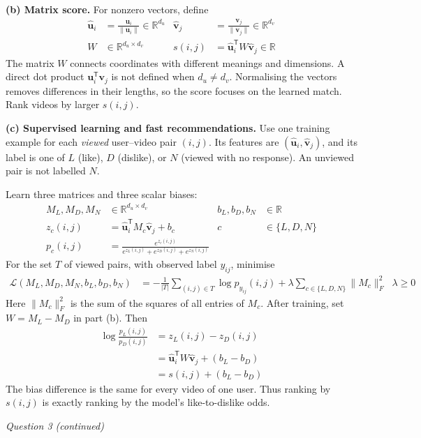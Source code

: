 \documentclass[11pt,a4paper]{article}
\newcommand{\R}{\mathbb{R}}
\newcommand{\norm}[1]{\lVert #1\rVert}
\begin{document}
\textbf{(b) Matrix score.} For nonzero vectors, define
\begin{align*}
\widehat{\mathbf u}_i&=\frac{\mathbf u_i}{\norm{\mathbf u_i}}\in\R^{d_u}&
\widehat{\mathbf v}_j&=\frac{\mathbf v_j}{\norm{\mathbf v_j}}\in\R^{d_v}\\
W&\in\R^{d_u\times d_v}&
s(i,j)&=\widehat{\mathbf u}_i^{\mathsf T}W\widehat{\mathbf v}_j
\in\R
\end{align*}
The matrix $W$ connects coordinates with different meanings and dimensions. A direct dot product $\mathbf u_i^{\mathsf T}\mathbf v_j$ is not defined when $d_u\ne d_v$. Normalising the vectors removes differences in their lengths, so the score focuses on the learned match. Rank videos by larger $s(i,j)$.

\textbf{(c) Supervised learning and fast recommendations.} Use one training example for each \emph{viewed} user--video pair $(i,j)$. Its features are $(\widehat{\mathbf u}_i,\widehat{\mathbf v}_j)$, and its label is one of $L$ (like), $D$ (dislike), or $N$ (viewed with no response). An unviewed pair is not labelled $N$.

Learn three matrices and three scalar biases:
\begin{align*}
M_L,M_D,M_N&\in\R^{d_u\times d_v}&
b_L,b_D,b_N&\in\R\\
z_c(i,j)&=\widehat{\mathbf u}_i^{\mathsf T}M_c\widehat{\mathbf v}_j+b_c
&c&\in\{L,D,N\}\\
p_c(i,j)&=\frac{e^{z_c(i,j)}}{e^{z_L(i,j)}+e^{z_D(i,j)}+e^{z_N(i,j)}}
\end{align*}
For the set $T$ of viewed pairs, with observed label $y_{ij}$, minimise
\begin{align*}
\mathcal L(M_L,M_D,M_N,b_L,b_D,b_N)
&=-\frac{1}{|T|}\sum_{(i,j)\in T}\log p_{y_{ij}}(i,j)
+\lambda\sum_{c\in\{L,D,N\}}\norm{M_c}_{F}^{2}
\;\;\lambda\ge 0
\end{align*}
Here $\norm{M_c}_{F}^{2}$ is the sum of the squares of all entries of $M_c$.
After training, set $W=M_L-M_D$ in part (b). Then
\begin{align*}
\log\frac{p_L(i,j)}{p_D(i,j)}
&=z_L(i,j)-z_D(i,j)\\
&=\widehat{\mathbf u}_i^{\mathsf T}W\widehat{\mathbf v}_j+(b_L-b_D)\\
&=s(i,j)+(b_L-b_D)
\end{align*}
The bias difference is the same for every video of one user. Thus ranking by $s(i,j)$ is exactly ranking by the model's like-to-dislike odds.

\clearpage
\textit{Question 3 (continued)}
\end{document}

